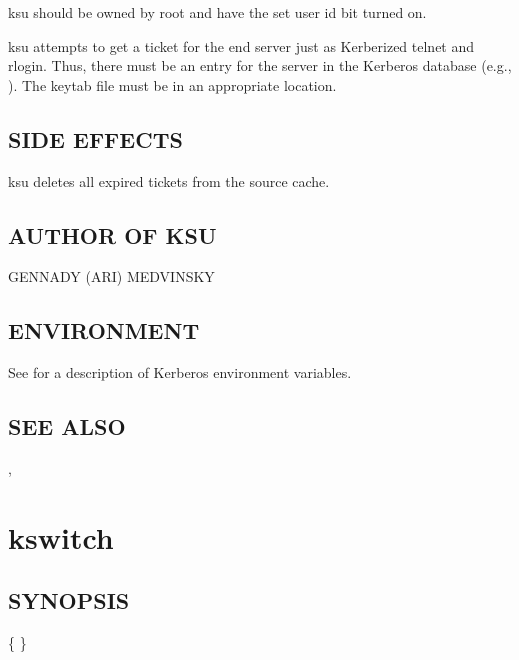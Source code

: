 \documentclass[letterpaper,10pt,english]{sphinxmanual}
\begin{document}
ksu should be owned by root and have the set user id bit turned on.

ksu attempts to get a ticket for the end server just as Kerberized
telnet and rlogin.  Thus, there must be an entry for the server in the
Kerberos database (e.g., ).  The keytab
file must be in an appropriate location.


\subsection{SIDE EFFECTS}
\label{\detokenize{user/user_commands/ksu:side-effects}}
ksu deletes all expired tickets from the source cache.


\subsection{AUTHOR OF KSU}
\label{\detokenize{user/user_commands/ksu:author-of-ksu}}
GENNADY (ARI) MEDVINSKY


\subsection{ENVIRONMENT}
\label{\detokenize{user/user_commands/ksu:environment}}
See {\hyperref[\detokenize{user/user_config/kerberos:kerberos-7}]{}} for a description of Kerberos environment
variables.


\subsection{SEE ALSO}
\label{\detokenize{user/user_commands/ksu:see-also}}
{\hyperref[\detokenize{user/user_config/kerberos:kerberos-7}]{}}, {\hyperref[\detokenize{user/user_commands/kinit:kinit-1}]{}}


\section{kswitch}
\label{\detokenize{user/user_commands/kswitch:kswitch-1}}\label{\detokenize{user/user_commands/kswitch:kswitch}}\label{\detokenize{user/user_commands/kswitch::doc}}

\subsection{SYNOPSIS}
\label{\detokenize{user/user_commands/kswitch:synopsis}}
\{ \textbar{} \}
\end{document}

